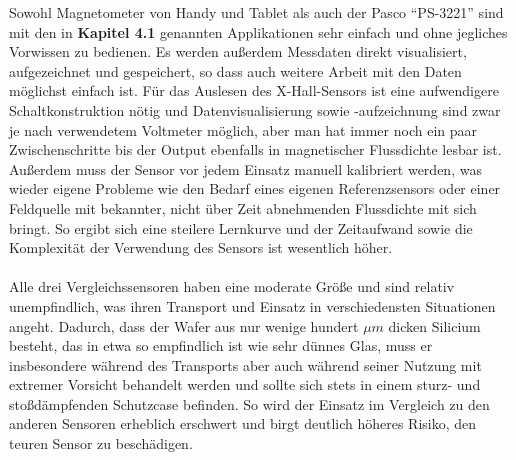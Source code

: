 \documentclass[12pt, a4paper]{article}
\begin{document}
Sowohl Magnetometer von Handy und Tablet als auch der Pasco ``PS-3221'' sind mit den in \textbf{Kapitel 4.1} genannten Applikationen sehr einfach und ohne jegliches Vorwissen zu bedienen. Es werden außerdem Messdaten direkt visualisiert, aufgezeichnet und gespeichert, so dass auch weitere Arbeit mit den Daten möglichst einfach ist.\newline
Für das Auslesen des X-Hall-Sensors ist eine aufwendigere Schaltkonstruktion nötig und Datenvisualisierung sowie -aufzeichnung sind zwar je nach verwendetem Voltmeter möglich, aber man hat immer noch ein paar Zwischenschritte bis der Output ebenfalls in magnetischer Flussdichte lesbar ist. Außerdem muss der Sensor vor jedem Einsatz manuell kalibriert werden, was wieder eigene Probleme wie den Bedarf eines eigenen Referenzsensors oder einer Feldquelle mit bekannter, nicht über Zeit abnehmenden Flussdichte mit sich bringt. So ergibt sich eine steilere Lernkurve und der Zeitaufwand sowie die Komplexität der Verwendung des Sensors ist wesentlich höher.\paragraph{}

Alle drei Vergleichssensoren haben eine moderate Größe und sind relativ unempfindlich, was ihren Transport und Einsatz in verschiedensten Situationen angeht.\newline
Dadurch, dass der Wafer aus nur wenige hundert $\mu{m}$ dicken Silicium besteht, das in etwa so empfindlich ist wie sehr dünnes Glas, muss er insbesondere während des Transports aber auch während seiner Nutzung mit extremer Vorsicht behandelt werden und sollte sich stets in einem sturz- und stoßdämpfenden Schutzcase befinden. So wird der Einsatz im Vergleich zu den anderen Sensoren erheblich erschwert und birgt deutlich höheres Risiko, den teuren Sensor zu beschädigen.\paragraph{}
\end{document}

